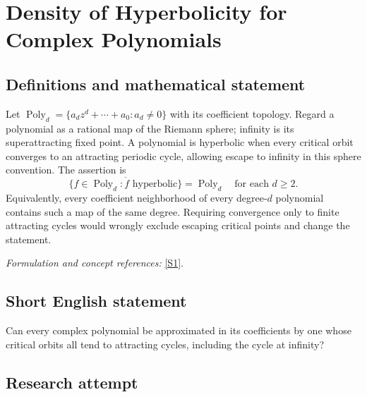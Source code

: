 \documentclass[11pt,a4paper]{article}
\newcommand{\sref}[2]{\hyperlink{source:#1:#2}{[S#2]}}
\newif\ifshowcatalogue
\newcommand{\cataloguescope}[1]{\ifshowcatalogue
 \paragraph{Exact scope in the supplied catalogue.}
 \begin{quote}\small #1\end{quote}\fi}
\begin{document}
\setcounter{section}{0}
\clearpage
\section*{\texorpdfstring{Density of Hyperbolicity for Complex Polynomials}{Density of Hyperbolicity for Complex Polynomials}}\label{statement}
\subsection{Definitions and mathematical statement}
Let $\operatorname{Poly}_d=\{a_dz^d+\cdots+a_0:a_d\ne0\}$ with its coefficient topology. Regard a polynomial as a rational map of the Riemann sphere; infinity is its superattracting fixed point. A polynomial is hyperbolic when every critical orbit converges to an attracting periodic cycle, allowing escape to infinity in this sphere convention. The assertion is
\[
 \overline{\{f\in\operatorname{Poly}_d:f\text{ hyperbolic}\}}=\operatorname{Poly}_d
 \quad\text{for each }d\ge2.
\]
Equivalently, every coefficient neighborhood of every degree-$d$ polynomial contains such a map of the same degree. Requiring convergence only to finite attracting cycles would wrongly exclude escaping critical points and change the statement.
\par\smallskip\textit{Formulation and concept references:} \sref{statement}{1}.
\cataloguescope{For each complex polynomial T of degree at least two, determine whether T can be approximated by polynomials of the same degree all of whose critical points converge under iteration to attracting periodic cycles, that is, whether hyperbolic polynomials are dense in the space of complex polynomials of each degree.}
\subsection{Short English statement}
Can every complex polynomial be approximated in its coefficients by one whose critical orbits all tend to attracting cycles, including the cycle at infinity?
\subsection{Research attempt}
\end{document}

